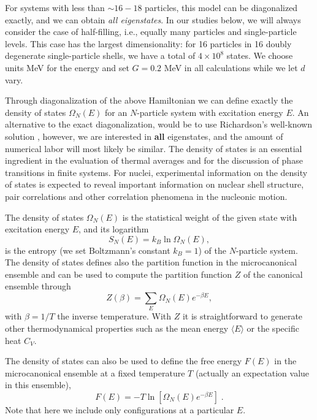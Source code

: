 \begin{multicols}{2}
For systems with less than $\sim 16-18$ particles, 
this model can be diagonalized
exactly, and we can obtain {\em all eigenstates}. 
In our studies below, we will always
consider the case of half-filling, i.e., equally many particles
and single-particle levels. This case has the largest dimensionality: for 
16 particles in 16 doubly degenerate single-particle shells, we have a
total of $4\times 10^8$ states. We choose units MeV for the energy and 
set $G=0.2$ MeV in all calculations while we let $d$ vary. 

Through diagonalization 
of the above Hamiltonian
we can define exactly the
density of states $\Omega_N(E)$ for an $N$-particle
system with excitation energy $E$. 
An alternative 
to the exact diagonalization, would be 
to  use Richardson's well-known 
solution \cite{richardson}, 
however, we are interested in {\bf all} eigenstates,
and the amount of numerical labor will most likely be similar.
The density of states is
an essential ingredient in the
evaluation of thermal averages and for the discussion of phase
transitions in finite systems. For nuclei, experimental 
information on the density of states
is expected to reveal important information on nuclear shell
structure, pair correlations and other correlation phenomena
in the nucleonic motion. 

The density of states $\Omega_N(E)$ is the statistical
weight of the given state with excitation energy $E$, and its logarithm
\begin{equation}
      S_N(E)=k_B\ln\Omega_N(E),  \label{eq:entromicro}
\end{equation}
is the entropy (we set Boltzmann's constant
$k_B=1$) of the $N$-particle system.  
The density of states defines also the partition function in the 
microcanonical ensemble and can be used to compute the 
partition function $Z$ of the canonical ensemble through
\begin{equation}
    Z(\beta)=\sum_E\Omega_N(E)e^{-\beta E},
    \label{eq:canonicalpart}
\end{equation}
with $\beta=1/T$ 
the inverse temperature.  With $Z$ it is straightforward to 
generate other thermodynamical
properties such as the mean energy 
$\langle E\rangle$ or the specific heat $C_V$.

The density of states can also be used to define 
the  free energy $F(E)$ in the microcanonical ensemble 
at a fixed temperature $T$ (actually an expectation value in this ensemble), 
\begin{equation}
    F(E)=-T\ln\left[\Omega_N(E)e^{-\beta E}\right]\;.
    \label{eq:freenergy}
\end{equation}
Note that here we include only
configurations at a particular $E$.
 

\end{multicols}
